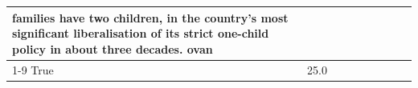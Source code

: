 \begin{table}[H]
\begin{tabular}{lllrlllll}
families have two children, in the country's most significant liberalisation of its strict one-child policy in about three decades. ovan \\
\cline{1-9}
True & 25.0%
\end{tabular}
\end{table}
